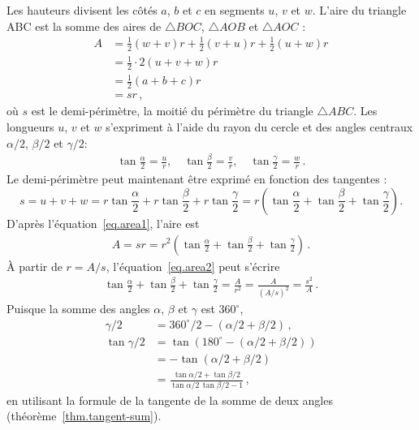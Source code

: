Les hauteurs divisent les côtés $a$, $b$ et $c$ en segments $u$, $v$ et $w$. L'aire du triangle ABC est la somme des aires de $\triangle BOC$, $\triangle AOB$ et $\triangle AOC$ :
%
\begin{subequations}
\begin{align}
A &= \frac{1}{2}(w+v)r + \frac{1}{2}(v+u)r + \frac{1}{2}(u+w)r\\
&=\frac{1}{2}\cdot 2(u+v+w)r\\
&=\frac{1}{2}(a+b+c)r\\
&=sr\,, \label{eq.area1}
\end{align}
\end{subequations}
où $s$ est le demi-périmètre, la moitié du périmètre du triangle $\triangle ABC$. Les longueurs  $u$, $v$ et $w$ s'expriment à l'aide du rayon du cercle et des angles centraux 
 $\alpha/2$, $\beta/2$ et $\gamma/2$:
\begin{align}
\tan \frac{\alpha}{2}= \frac{u}{r},\quad
\tan \frac{\beta}{2} = \frac{v}{r},\quad
\tan \frac{\gamma}{2} =\frac{w}{r}\,.\label{eq.uvw}
\end{align}
Le demi-périmètre peut maintenant être exprimé en fonction des tangentes :
\[
s = u+v+w = r\tan \frac{\alpha}{2}+r\tan \frac{\beta}{2}+r\tan \frac{\gamma}{2} = r\left(\tan \frac{\alpha}{2}+\tan \frac{\beta}{2}+\tan \frac{\gamma}{2}\right).
\]
D'après l'équation~\ref{eq.area1},  l'aire est 
\begin{align}
A = sr = r^2\left(\tan \frac{\alpha}{2}+\tan \frac{\beta}{2}+\tan \frac{\gamma}{2}\right)\,.\label{eq.area2}
\end{align}
\`A partir de $r=A/s$, l'équation~\ref{eq.area2} peut s'écrire
\begin{align}
\tan \frac{\alpha}{2}+\tan \frac{\beta}{2}+\tan \frac{\gamma}{2} = \frac{A}{r^2} = \frac{A}{(A/s)^2} = \frac{s^2}{A}\,.\label{eq.area3}
\end{align}
Puisque la somme des angles $\alpha$, $\beta$ et $\gamma$ est $360^\circ$,
%
\begin{subequations}
\begin{align}
\gamma/2 &= 360^\circ/2 - (\alpha/2 + \beta/2)\,,\\
\tan\gamma/2 &= \tan(180^\circ - (\alpha/2 + \beta/2))\\
 &= -\tan (\alpha/2 + \beta/2)\\
&= \frac{\tan\alpha/2 + \tan\beta/2}{\tan\alpha/2 \, \tan\beta/2-1}\,,\label{eq.tangent1}
\end{align}
\end{subequations}
en utilisant la formule de la tangente de la somme de deux angles (théorème~\ref{thm.tangent-sum}).

